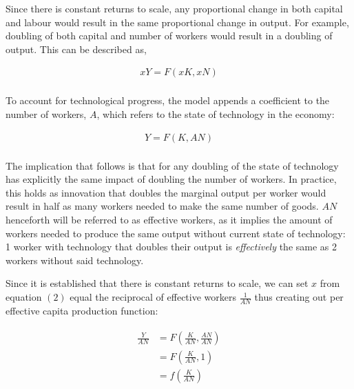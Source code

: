 \documentclass[
]{article}
\begin{document}
Since there is constant returns to scale, any proportional change in
both capital and labour would result in the same proportional change in
output. For example, doubling of both capital and number of workers
would result in a doubling of output. This can be described as,

{\[\begin{matrix}
{xY = F(xK,xN)} \\
\end{matrix}\]}

To account for technological progress, the model appends a coefficient
to the number of workers, {\(A\)}, which refers to the state of
technology in the economy:

{\[\begin{matrix}
{Y = F(K,AN)} \\
\end{matrix}\]}

The implication that follows is that for any doubling of the state of
technology has explicitly the same impact of doubling the number of
workers. In practice, this holds as innovation that doubles the marginal
output per worker would result in half as many workers needed to make
the same number of goods. {\(AN\)} henceforth will be referred to as
effective workers, as it implies the amount of workers needed to produce
the same output without current state of technology: 1 worker with
technology that doubles their output is \emph{effectively} the same as 2
workers without said technology.

Since it is established that there is constant returns to scale, we can
set {\(x\)} from equation {\((2)\)} equal the reciprocal of effective
workers {\(\frac{1}{AN}\)} thus creating out per effective capita
production function:

\[\begin{matrix}
\begin{matrix}
\frac{Y}{AN} & {= F\left( \frac{K}{AN},\frac{AN}{AN} \right)} \\
 & {= F\left( \frac{K}{AN},1 \right)} \\
 & {= f\left( \frac{K}{AN} \right)} \\
\end{matrix} \\
\end{matrix}\]
\end{document}
